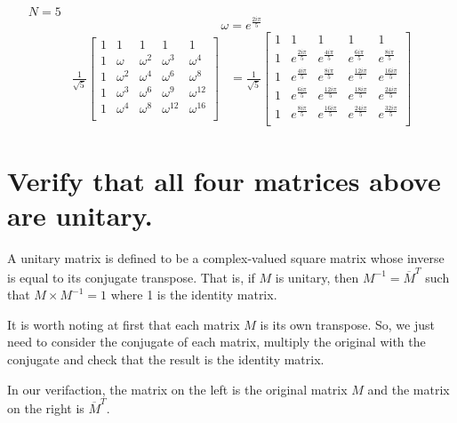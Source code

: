 \documentclass[11pt]{article}
\begin{document}
\begin{itemize}
\item[$N = 5$] $$\omega = e^{\frac{2 i \pi}{5}}$$
	\begin{align*}
	\frac{1}{\sqrt{5}}
	\begin{bmatrix}
		1 & 1 & 1 & 1 & 1 \\
		1 & \omega & \omega^2 & \omega^3 & \omega^4 \\
		1 & \omega^2 & \omega^4 & \omega^6 & \omega^8 \\
		1 & \omega^3 & \omega^6 & \omega^9 & \omega^{12} \\
		1 & \omega^4 & \omega^8 & \omega^{12} & \omega^{16}\\
	\end{bmatrix} &=
	\frac{1}{\sqrt{5}}
	\begin{bmatrix}
		1 & 1 & 1 & 1 & 1 \\
		1 & e^{\frac{2 i \pi}{5}} & e^{\frac{4 i \pi}{5}} & e^{\frac{6 i \pi}{5}} & e^{\frac{8 i \pi}{5}}\\
		1 & e^{\frac{4 i \pi}{5}} & e^{\frac{8 i \pi}{5}} & e^{\frac{12 i \pi}{5}} 
		& e^{\frac{16 i \pi}{5}} \\
		1 & e^{\frac{6 i \pi}{5}} & e^{\frac{12 i \pi}{5}} & e^{\frac{18 i \pi}{5}} & e^{\frac{24 i \pi}{5}} \\
		1 & e^{\frac{8 i \pi}{5}} & e^{\frac{16 i \pi}{5}} & e^{\frac{24 i \pi}{5}} & e^{\frac{32 i \pi}{5}}\\
	\end{bmatrix}
	\end{align*}




\end{itemize}


\section{Verify that all four matrices above are unitary.}
A unitary matrix is defined to be a complex-valued square matrix whose inverse is equal to 
its conjugate transpose. 
That is, if $M$ is unitary, then $M^{-1} = \overline{M}^T$ such that $M \times M^{-1} = 1$ where 1 is the identity matrix. 

It is worth noting at first that each matrix $M$ is its own transpose. So, we just need to consider the conjugate of each matrix, multiply the original with the conjugate and check that the result is the identity matrix.

In our verifaction, the matrix on the left is the original matrix $M$ and the matrix on the right is $\overline{M}^T$. 
\end{document}
